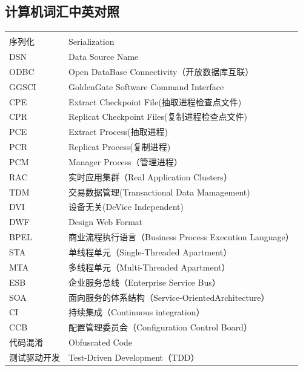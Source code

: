 \documentclass{book}
\begin{document}

\clearpage

\subsection{计算机词汇中英对照}		

\begin{longtable}{lp{10cm}}
	\multirow{1}{*}{}			
	& \multicolumn{1}{c}{}\\
	序列化 & Serialization\\
	DSN & Data Source Name\\
	ODBC & Open DataBase Connectivity（开放数据库互联）\\
	GGSCI & GoldenGate Software Command Interface\\
	CPE & Extract Checkpoint File(抽取进程检查点文件)\\
	CPR & Replicat Checkpoint Files(复制进程检查点文件)\\
	PCE & Extract Process(抽取进程)\\
	PCR & Replicat Process(复制进程)\\
	PCM & Manager Process（管理进程）\\
	RAC & 实时应用集群（Real Application Clusters）\\
	TDM & 交易数据管理(Transactional Data Mamagement)\\
	DVI & 设备无关(DeVice Independent)\\
	DWF & Design Web Format\\
	BPEL & 商业流程执行语言（Business Process Execution Language）\\
	STA & 单线程单元（Single-Threaded Apartment）\\
	MTA & 多线程单元（Multi-Threaded Apartment）\\
	ESB & 企业服务总线（Enterprise Service Bus）\\
	SOA & 面向服务的体系结构（Service-OrientedArchitecture）\\
	CI & 持续集成（Continuous integration）\\
	CCB & 配置管理委员会（Configuration Control Board）\\
	代码混淆 & Obfuscated Code\\
	测试驱动开发 & Test-Driven Development（TDD）\\

\end{longtable}
\end{document}
